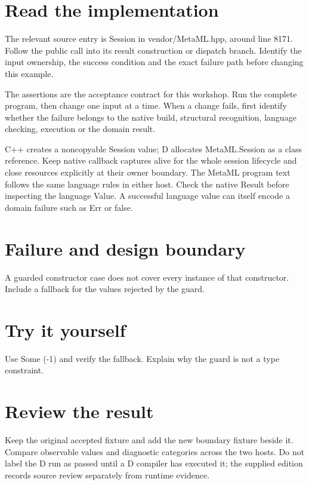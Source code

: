 \section*{Read the implementation}
The relevant source entry is Session in vendor/MetaML.hpp, around line 8171. Follow the public call into its result construction or dispatch branch. Identify the input ownership, the success condition and the exact failure path before changing this example.

The assertions are the acceptance contract for this workshop. Run the complete program, then change one input at a time. When a change fails, first identify whether the failure belongs to the native build, structural recognition, language checking, execution or the domain result.

\clearpage
{}
C++ creates a noncopyable Session value; D allocates MetaML.Session as a class reference. Keep native callback captures alive for the whole session lifecycle and close resources explicitly at their owner boundary. The MetaML program text follows the same language rules in either host. Check the native Result before inspecting the language Value. A successful language value can itself encode a domain failure such as Err or false.


\section*{Failure and design boundary}
A guarded constructor case does not cover every instance of that constructor. Include a fallback for the values rejected by the guard.

\section*{Try it yourself}
Use Some (-1) and verify the fallback. Explain why the guard is not a type constraint.

\section*{Review the result}
Keep the original accepted fixture and add the new boundary fixture beside it. Compare observable values and diagnostic categories across the two hosts. Do not label the D run as passed until a D compiler has executed it; the supplied edition records source review separately from runtime evidence.

